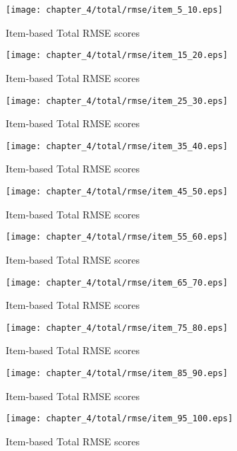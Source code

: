 \begin{figure}[H]
\centering
\texttt{[image: chapter\_4/total/rmse/item\_5\_10.eps]}
\caption{Item-based Total RMSE scores}
\end{figure}

\begin{figure}[H]
\centering
\texttt{[image: chapter\_4/total/rmse/item\_15\_20.eps]}
\caption{Item-based Total RMSE scores}
\end{figure}

\begin{figure}[H]
\centering
\texttt{[image: chapter\_4/total/rmse/item\_25\_30.eps]}
\caption{Item-based Total RMSE scores}
\end{figure}

\begin{figure}[H]
\centering
\texttt{[image: chapter\_4/total/rmse/item\_35\_40.eps]}
\caption{Item-based Total RMSE scores}
\end{figure}

\begin{figure}[H]
\centering
\texttt{[image: chapter\_4/total/rmse/item\_45\_50.eps]}
\caption{Item-based Total RMSE scores}
\end{figure}

\begin{figure}[H]
\centering
\texttt{[image: chapter\_4/total/rmse/item\_55\_60.eps]}
\caption{Item-based Total RMSE scores}
\end{figure}

\begin{figure}[H]
\centering
\texttt{[image: chapter\_4/total/rmse/item\_65\_70.eps]}
\caption{Item-based Total RMSE scores}
\end{figure}

\begin{figure}[H]
\centering
\texttt{[image: chapter\_4/total/rmse/item\_75\_80.eps]}
\caption{Item-based Total RMSE scores}
\end{figure}

\begin{figure}[H]
\centering
\texttt{[image: chapter\_4/total/rmse/item\_85\_90.eps]}
\caption{Item-based Total RMSE scores}
\end{figure}

\begin{figure}[H]
\centering
\texttt{[image: chapter\_4/total/rmse/item\_95\_100.eps]}
\caption{Item-based Total RMSE scores}
\end{figure}

